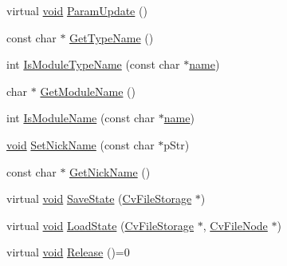\begin{DoxyCompactItemize}
\item 
virtual \hyperlink{legacy_8hpp_a8bb47f092d473522721002c86c13b94e}{void} \hyperlink{classCvVSModule_acc31eb995390002f298d4b1d6034940f}{Param\-Update} ()
\item 
const char $\ast$ \hyperlink{classCvVSModule_a1afb3cb19efba9321b97c936602a791a}{Get\-Type\-Name} ()
\item 
int \hyperlink{classCvVSModule_af8ae3ee7888294c15c88724c24c840a8}{Is\-Module\-Type\-Name} (const char $\ast$\hyperlink{core__c_8h_add928d8eb85ea33a25a67db3406d4887}{name})
\item 
char $\ast$ \hyperlink{classCvVSModule_ae1dbbeeeeb254c30b99f046c0801c742}{Get\-Module\-Name} ()
\item 
int \hyperlink{classCvVSModule_a0e40cc3ef7c00076f1454ae96c3cf52d}{Is\-Module\-Name} (const char $\ast$\hyperlink{core__c_8h_add928d8eb85ea33a25a67db3406d4887}{name})
\item 
\hyperlink{legacy_8hpp_a8bb47f092d473522721002c86c13b94e}{void} \hyperlink{classCvVSModule_a195a0ac70890721ed74366963b025e40}{Set\-Nick\-Name} (const char $\ast$p\-Str)
\item 
const char $\ast$ \hyperlink{classCvVSModule_a4e88432ebff5ba68026f0ca5062343c9}{Get\-Nick\-Name} ()
\item 
virtual \hyperlink{legacy_8hpp_a8bb47f092d473522721002c86c13b94e}{void} \hyperlink{classCvVSModule_a32e569ec1fbbc58d93bbd6a2113fb54f}{Save\-State} (\hyperlink{core_2types__c_8h_a84556d1bb6f1b8b02c04c60246747a7e}{Cv\-File\-Storage} $\ast$)
\item 
virtual \hyperlink{legacy_8hpp_a8bb47f092d473522721002c86c13b94e}{void} \hyperlink{classCvVSModule_ad0d046d9844e3582759614fb0ea780f2}{Load\-State} (\hyperlink{core_2types__c_8h_a84556d1bb6f1b8b02c04c60246747a7e}{Cv\-File\-Storage} $\ast$, \hyperlink{structCvFileNode}{Cv\-File\-Node} $\ast$)
\item 
virtual \hyperlink{legacy_8hpp_a8bb47f092d473522721002c86c13b94e}{void} \hyperlink{classCvVSModule_a5501dc4749ea61dfa6a44621ecc41824}{Release} ()=0
\end{DoxyCompactItemize}
